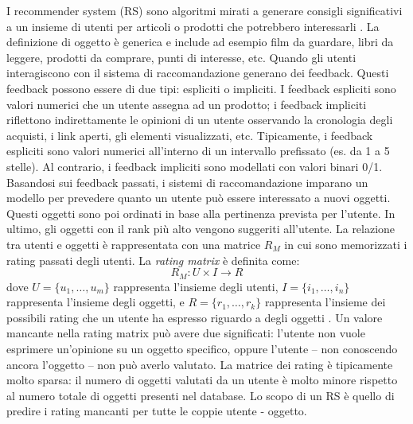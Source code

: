 \documentclass[12pt,italian]{report}
\begin{document}
I recommender system (RS) sono algoritmi mirati a generare consigli significativi a un insieme di utenti per articoli o prodotti che potrebbero interessarli \cite{recsys-definition}. La definizione di oggetto è generica e include ad esempio film da guardare, libri da leggere, prodotti da comprare, punti di interesse, etc. 
Quando gli utenti interagiscono con il sistema di raccomandazione generano dei feedback. Questi feedback possono essere di due tipi: espliciti o impliciti. I feedback espliciti sono valori numerici che un utente assegna ad un prodotto; i feedback impliciti riflettono indirettamente le opinioni di un utente osservando la cronologia degli acquisti, i link aperti, gli elementi visualizzati, etc. Tipicamente, i feedback espliciti sono valori numerici all'interno di un intervallo prefissato (es. da 1 a 5 stelle). Al contrario, i feedback impliciti sono modellati con valori binari 0/1.
Basandosi sui feedback passati, i sistemi di raccomandazione imparano un modello per prevedere quanto un utente può essere interessato a nuovi oggetti. Questi oggetti sono poi ordinati in base alla pertinenza prevista per l'utente. In ultimo, gli oggetti con il rank più alto vengono suggeriti all'utente. La relazione tra utenti e oggetti è rappresentata con una matrice $R_M$ in cui sono memorizzati i rating passati degli utenti.
La \textit{rating matrix} è definita come: 
$$
R_M: U \times I \rightarrow R
$$
dove $U = \{u_1, \dots, u_m\}$ rappresenta l'insieme degli utenti, $I = \{i_1,\dots, i_n\}$ rappresenta l'insieme degli oggetti, e $R = \{r_1, \dots, r_k\}$ rappresenta l'insieme dei possibili rating che un utente ha espresso riguardo a degli oggetti \cite{survey-mattia}. Un valore mancante nella rating matrix può avere due significati: l'utente non vuole esprimere un'opinione su un oggetto specifico, oppure l'utente -- non conoscendo ancora l'oggetto -- non può averlo valutato. La matrice dei rating è tipicamente molto sparsa: il numero di oggetti valutati da un utente è molto minore rispetto al numero totale di oggetti presenti nel database. Lo scopo di un RS è quello di predire i rating mancanti per tutte le coppie utente - oggetto.
\end{document}
